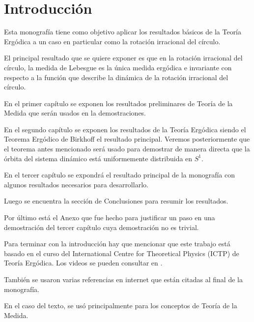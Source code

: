 \chapter*{Introducción}

Esta monografía tiene como objetivo aplicar los resultados básicos de la Teoría Ergódica a un caso en particular como la rotación irracional del círculo.

El principal resultado que se quiere exponer es que en la rotación irracional del círculo, la medida de Lebesgue es la única medida ergódica e invariante con respecto a la función que describe la dinámica de la rotación irracional del círculo.

En el primer capítulo se exponen los resultados preliminares de Teoría de la Medida que serán usados en la demostraciones.

En el segundo capítulo se exponen los resultados de la Teoría Ergódica siendo el Teorema Ergódico de Birkhoff el resultado principal. Veremos posteriormente que el teorema antes mencionado será usado para demostrar de manera directa que la órbita del sistema dinámico está uniformemente distribuida en $S^1$.

En el tercer capítulo se expondrá el resultado principal de la monografía con algunos resultados necesarios para desarrollarlo.

Luego se encuentra la sección de Conclusiones para resumir los resultados.

Por último está el Anexo que fue hecho para justificar un paso en una demostración del tercer capítulo cuya demostración no es trivial.

Para terminar con la introducción hay que mencionar que este trabajo está basado en el curso del International Centre for Theoretical Physics (ICTP) de Teoría Ergódica. Los videos se pueden consultar en \cite{youtube}.

También se usaron varias referencias en internet que están citadas al final de la monografía.

En el caso del texto, se usó principalmente \cite{bartle} para los conceptos de Teoría de la Medida.